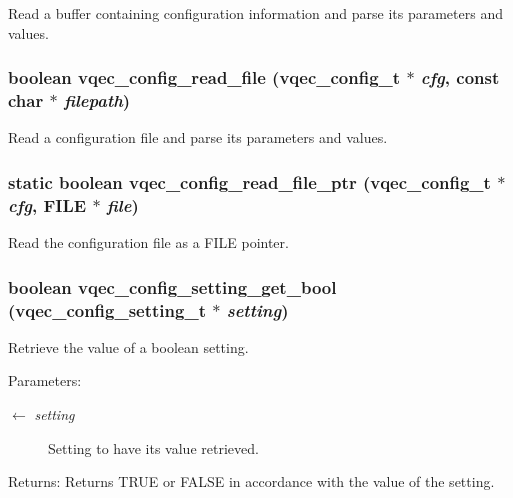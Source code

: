 Read a buffer containing configuration information and parse its parameters and values. 
\subsubsection{\setlength{\rightskip}{0pt plus 5cm}boolean vqec\_\-config\_\-read\_\-file (\bf{vqec\_\-config\_\-t} $\ast$ {\em cfg}, const char $\ast$ {\em filepath})}\label{vqec__config__parser_8c_5250d19c8cd6d637ccb1646604b8b43b}


Read a configuration file and parse its parameters and values. 
\subsubsection{\setlength{\rightskip}{0pt plus 5cm}static boolean vqec\_\-config\_\-read\_\-file\_\-ptr (\bf{vqec\_\-config\_\-t} $\ast$ {\em cfg}, FILE $\ast$ {\em file})\hspace{0.3cm}{\tt  [static]}}\label{vqec__config__parser_8c_518f680a48b047b8dad4b4e3ed5d3761}


Read the configuration file as a FILE pointer. 
\subsubsection{\setlength{\rightskip}{0pt plus 5cm}boolean vqec\_\-config\_\-setting\_\-get\_\-bool (\bf{vqec\_\-config\_\-setting\_\-t} $\ast$ {\em setting})}\label{vqec__config__parser_8c_2124526ced2aa28db34fb626c93773aa}


Retrieve the value of a boolean setting.

\begin{Desc}
\item[Parameters:]
\begin{description}
\item[\mbox{$\leftarrow$} {\em setting}]Setting to have its value retrieved. \end{description}
\end{Desc}
\begin{Desc}
\item[Returns:]Returns TRUE or FALSE in accordance with the value of the setting. \end{Desc}
